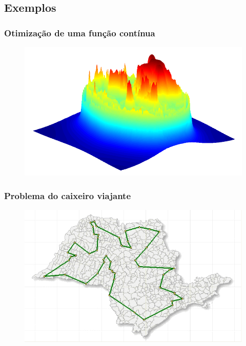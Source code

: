 \documentclass[xcolor=dvipsnames]{beamer}
\begin{document}
\subsection{Exemplos}

\begin{frame}%
\frametitle{Otimização de uma função contínua}
\begin{figure}
\centering
\includegraphics[scale=0.4]{img/opt_function.png}
\end{figure}
\end{frame}%


\begin{frame}%
\frametitle{Problema do caixeiro viajante}
\begin{figure}
\centering
\includegraphics[scale=0.5]{img/tsp.jpg}
\end{figure}
\end{frame}%
\end{document}
